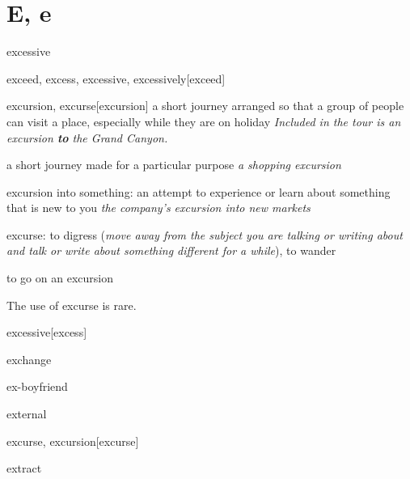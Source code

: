 \section{E, e}

\begin{DefWord}{excessive}
\end{DefWord}

\begin{DefWord}{exceed, excess, excessive, excessively}[exceed]
\end{DefWord}

\begin{DefWord}{excursion, excurse}[excursion]
    a short journey arranged so that a group of people can visit a place, especially while they are on holiday
    \textit{Included in the tour is an excursion \textbf{to} the Grand Canyon.}

    a short journey made for a particular purpose
    \textit{a shopping excursion}

    excursion into something: an attempt to experience or learn about something that is new to you
    \textit{the company's excursion into new markets}

    excurse: to digress (\textit{move away from the subject you are talking or writing about and talk or write about something different for a while}), to wander

    to go on an excursion
\end{DefWord}

\begin{remark}
    The use of excurse is rare.
\end{remark}

\begin{DefWord}{excessive}[excess]
\end{DefWord}

\begin{DefWord}{exchange}
\end{DefWord}

\begin{DefWord}{ex-boyfriend}
\end{DefWord}

\begin{DefWord}{external}
\end{DefWord}

\begin{DefWord}{excurse, excursion}[excurse]
\end{DefWord}

\begin{DefWord}{extract}
\end{DefWord}

